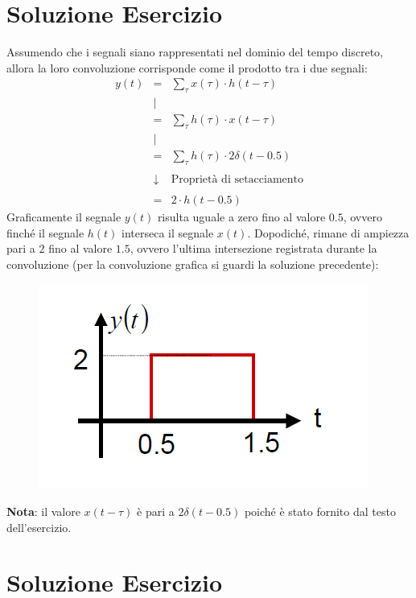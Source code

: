 \documentclass[a4paper]{article}
\begin{document}
	\section{Soluzione Esercizio}
	
	Assumendo che i segnali siano rappresentati nel dominio del tempo discreto, allora la loro convoluzione corrisponde come il prodotto tra i due segnali:
	\begin{equation*}
		\begin{array}{lcl}
			y\left(t\right) & = & \displaystyle\sum_{\tau} x\left(\tau\right) \cdot h\left(t - \tau\right) \\
			& | & \\
			& = & \displaystyle\sum_{\tau} h\left(\tau\right) \cdot x\left(t - \tau\right) \\
			& | & \\
			& = & \displaystyle\sum_{\tau} h\left(\tau\right) \cdot 2\delta\left(t-0.5\right) \\
			\\
			& \downarrow & \text{Proprietà di setacciamento} \\
			\\
			& = & 2 \cdot h\left(t-0.5\right)
		\end{array}
	\end{equation*}
	Graficamente il segnale $y\left(t\right)$ risulta uguale a zero fino al valore $0.5$, ovvero finché il segnale $h\left(t\right)$ interseca il segnale $x\left(t\right)$. Dopodiché, rimane di ampiezza pari a $2$ fino al valore $1.5$, ovvero l'ultima intersezione registrata durante la convoluzione (per la convoluzione grafica si guardi la soluzione precedente):
	\begin{figure}[!htp]
		\centering
		\includegraphics[width=.4\textwidth]{img/fig_3.png}
	\end{figure}

	\noindent
	\textbf{Nota}: il valore $x\left(t-\tau\right)$ è pari a $2\delta\left(t-0.5\right)$ poiché è stato fornito dal testo dell'esercizio.\newpage
	
	\section{Soluzione Esercizio}
	
\end{document}
